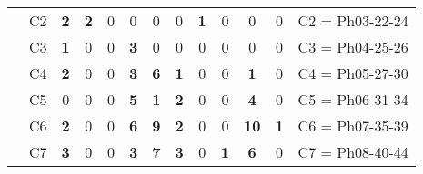 \begin{table}[H]
{\begin{tabular}{|ccrrrrrrrrrrc|}
\multicolumn{1}{|c|}{}                                      & \multicolumn{1}{c|}{C2} & \multicolumn{1}{c|}{\textbf{2}}  & \multicolumn{1}{c|}{\textbf{2}} & \multicolumn{1}{c|}{0}          & \multicolumn{1}{c|}{0}          & \multicolumn{1}{c|}{0}  & \multicolumn{1}{c|}{0}           & \multicolumn{1}{c|}{\textbf{1}} & \multicolumn{1}{c|}{0}          & \multicolumn{1}{c|}{0}           & \multicolumn{1}{c|}{0}          & C2 = Ph03-22-24   \\ \cline{2-13}
\multicolumn{1}{|c|}{}                                      & \multicolumn{1}{c|}{C3} & \multicolumn{1}{c|}{\textbf{1}}  & \multicolumn{1}{c|}{0}          & \multicolumn{1}{c|}{0}          & \multicolumn{1}{c|}{\textbf{3}} & \multicolumn{1}{c|}{0}  & \multicolumn{1}{c|}{0}           & \multicolumn{1}{c|}{0}          & \multicolumn{1}{c|}{0}          & \multicolumn{1}{c|}{0}           & \multicolumn{1}{c|}{0}          & C3 = Ph04-25-26   \\ \cline{2-13}
\multicolumn{1}{|c|}{}                                      & \multicolumn{1}{c|}{C4} & \multicolumn{1}{c|}{\textbf{2}}  & \multicolumn{1}{c|}{0}          & \multicolumn{1}{c|}{0}          & \multicolumn{1}{c|}{\textbf{3}} & \multicolumn{1}{c|}{\textbf{6}}  & \multicolumn{1}{c|}{\textbf{1}}  & \multicolumn{1}{c|}{0}          & \multicolumn{1}{c|}{0}          & \multicolumn{1}{c|}{\textbf{1}}  & \multicolumn{1}{c|}{0}          & C4 = Ph05-27-30   \\ \cline{2-13}
\multicolumn{1}{|c|}{}                                      & \multicolumn{1}{c|}{C5} & \multicolumn{1}{c|}{0}  & \multicolumn{1}{c|}{0}          & \multicolumn{1}{c|}{0}          & \multicolumn{1}{c|}{\textbf{5}} & \multicolumn{1}{c|}{\textbf{1}}  & \multicolumn{1}{c|}{\textbf{2}}  & \multicolumn{1}{c|}{0}          & \multicolumn{1}{c|}{0}          & \multicolumn{1}{c|}{\textbf{4}}  & \multicolumn{1}{c|}{0}          & C5 = Ph06-31-34   \\ \cline{2-13}
\multicolumn{1}{|c|}{}                                      & \multicolumn{1}{c|}{C6} & \multicolumn{1}{c|}{\textbf{2}}  & \multicolumn{1}{c|}{0}          & \multicolumn{1}{c|}{0}          & \multicolumn{1}{c|}{\textbf{6}} & \multicolumn{1}{c|}{\textbf{9}}  & \multicolumn{1}{c|}{\textbf{2}}  & \multicolumn{1}{c|}{0}          & \multicolumn{1}{c|}{0}          & \multicolumn{1}{c|}{\textbf{10}} & \multicolumn{1}{c|}{\textbf{1}} & C6 = Ph07-35-39   \\ \cline{2-13}
\multicolumn{1}{|c|}{}                                      & \multicolumn{1}{c|}{C7} & \multicolumn{1}{c|}{\textbf{3}}  & \multicolumn{1}{c|}{0}          & \multicolumn{1}{c|}{0}          & \multicolumn{1}{c|}{\textbf{3}} & \multicolumn{1}{c|}{\textbf{7}}  & \multicolumn{1}{c|}{\textbf{3}}  & \multicolumn{1}{c|}{0}          & \multicolumn{1}{c|}{\textbf{1}} & \multicolumn{1}{c|}{\textbf{6}}  & \multicolumn{1}{c|}{0}          & C7 = Ph08-40-44   \\ \cline{2-13}

\end{tabular}}
\end{table}
